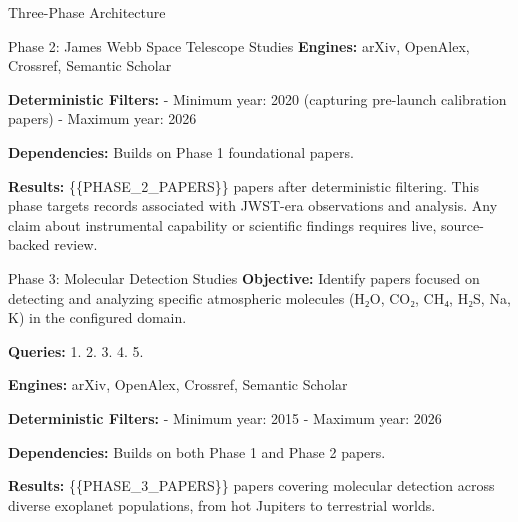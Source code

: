 \documentclass[
  ignorenonframetext,
]{beamer}
\begin{document}
\begin{frame}{Three-Phase Architecture}
\begin{block}{Phase 2: James Webb Space Telescope Studies}
\textbf{Engines:} arXiv, OpenAlex, Crossref, Semantic Scholar

\textbf{Deterministic Filters:} - Minimum year: 2020 (capturing
pre-launch calibration papers) - Maximum year: 2026

\textbf{Dependencies:} Builds on Phase 1 foundational papers.

\textbf{Results:} \{\{PHASE\_2\_PAPERS\}\} papers after deterministic
filtering. This phase targets records associated with JWST-era
observations and analysis. Any claim about instrumental capability or
scientific findings requires live, source-backed review.
\end{block}

\begin{block}{Phase 3: Molecular Detection Studies}
\label{phase-3-molecular-detection-studies}
\textbf{Objective:} Identify papers focused on detecting and analyzing
specific atmospheric molecules (H₂O, CO₂, CH₄, H₂S, Na, K) in the
configured domain.

\textbf{Queries:} 1.
2.
3. 
4.  5.

\textbf{Engines:} arXiv, OpenAlex, Crossref, Semantic Scholar

\textbf{Deterministic Filters:} - Minimum year: 2015 - Maximum year:
2026

\textbf{Dependencies:} Builds on both Phase 1 and Phase 2 papers.

\textbf{Results:} \{\{PHASE\_3\_PAPERS\}\} papers covering molecular
detection across diverse exoplanet populations, from hot Jupiters to
terrestrial worlds.
\end{block}
\end{frame}
\end{document}
